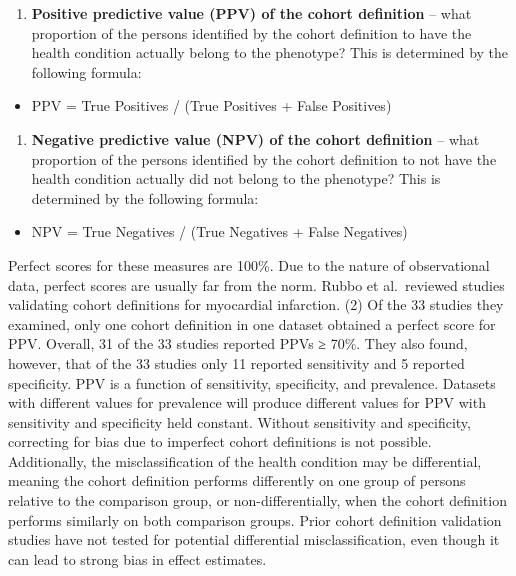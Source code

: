 \documentclass[
  letterpaper,
  paper=7in:10in,
  pagesize=pdftex,
  headinclude=on,
  footinclude=on,
  12pt]{scrbook}
\providecommand{\tightlist}{%
  \setlength{\itemsep}{0pt}\setlength{\parskip}{0pt}}\usepackage{longtable,booktabs,array}
\begin{document}
\begin{enumerate}
\def\labelenumi{\arabic{enumi}.}
\tightlist
\item
  \textbf{Positive predictive value (PPV) of the cohort definition} --
  what proportion of the persons identified by the cohort definition to
  have the health condition actually belong to the phenotype? This is
  determined by the following formula:
\end{enumerate}

\begin{itemize}
\tightlist
\item
  PPV = True Positives / (True Positives + False Positives)
\end{itemize}

\begin{enumerate}
\def\labelenumi{\arabic{enumi}.}
\tightlist
\item
  \textbf{Negative predictive value (NPV) of the cohort definition} --
  what proportion of the persons identified by the cohort definition to
  not have the health condition actually did not belong to the
  phenotype? This is determined by the following formula:
\end{enumerate}

\begin{itemize}
\tightlist
\item
  NPV = True Negatives / (True Negatives + False Negatives)
\end{itemize}

Perfect scores for these measures are 100\%. Due to the nature of
observational data, perfect scores are usually far from the norm. Rubbo
et al.~reviewed studies validating cohort definitions for myocardial
infarction. (2) Of the 33 studies they examined, only one cohort
definition in one dataset obtained a perfect score for PPV. Overall, 31
of the 33 studies reported PPVs ≥ 70\%. They also found, however, that
of the 33 studies only 11 reported sensitivity and 5 reported
specificity. PPV is a function of sensitivity, specificity, and
prevalence. Datasets with different values for prevalence will produce
different values for PPV with sensitivity and specificity held constant.
Without sensitivity and specificity, correcting for bias due to
imperfect cohort definitions is not possible. Additionally, the
misclassification of the health condition may be differential, meaning
the cohort definition performs differently on one group of persons
relative to the comparison group, or non-differentially, when the cohort
definition performs similarly on both comparison groups. Prior cohort
definition validation studies have not tested for potential differential
misclassification, even though it can lead to strong bias in effect
estimates.
\end{document}

